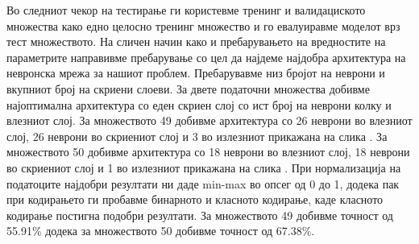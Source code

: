 \begin{table}[hbtp]
 \centering
\caption{Оптимална конфигурација на моделот во Керас за податочно множество 50}
\label{table:params_conf_50}
\end{table}

Во следниот чекор на тестирање ги користевме тренинг и валидациското множества како едно целосно тренинг множество и го евалуиравме моделот врз тест множеството. На сличен начин како и пребарувањето на вредностите на параметрите направивме пребарување со цел да најдеме најдобра архитектура на невронска мрежа за нашиот проблем. Пребарувавме низ бројот на неврони и вкупниот број на скриени слоеви. За двете податочни множества добивме најоптимална архитектура со еден скриен слој со ист број на неврони колку и влезниот слој. За множеството 49 добивме архитектура со 26 неврони во влезниот слој, 26 неврони во скриениот слој и 3 во излезниот прикажана на слика . За множеството 50 добивме архитектура со 18 неврони во влезниот слој, 18 неврони во скриениот слој и 1 во излезниот прикажана на слика . При нормализација на податоците најдобри резултати ни даде min-max во опсег од 0 до 1, додека пак при кодирањето ги пробавме бинарното и класното кодирање, каде класното кодирање постигна подобри резултати. 
За множеството 49 добивме точност од 55.91\% додека за множеството 50 добивме точност од 67.38\%.

